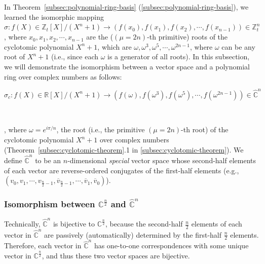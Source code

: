 In Theorem~\ref*{subsec:polynomial-ring-basis} (\autoref{subsec:polynomial-ring-basis}), we learned the isomorphic mapping $\sigma: f(X) \in \mathbb{Z}_t[X]/(X^n + 1) \longrightarrow (f(x_0),f(x_1),f(x_2), \cdots, f(x_{n-1})) \in \mathbb{Z}_t^n$, where $x_0, x_1, x_2, \cdots, x_{n-1}$ are the ($(\mu=2n)$-th primitive) roots of the cyclotomic polynomial $X^n + 1$, which are $\omega, \omega^3, \omega^5, \cdots, \omega^{2n-1}$, where $\omega$ can be any root of $X^n + 1$ (i.e., since each $\omega$ is a generator of all roots). In this subsection, we will demonstrate the isomorphism between a vector space and a polynomial ring over complex numbers as follows: 

$\sigma_c: f(X) \in \mathbb{R}[X]/(X^n + 1) \longrightarrow (f(\omega),f(\omega^3),f(\omega^5), \cdots, f(\omega^{2n-1})) \in \mathbb{\hat{C}}^{n}$

$ $

, where $\omega = e^{i\pi/n}$, the root (i.e., the primitive $(\mu=2n)$-th root) of the cyclotomic polynomial $X^n + 1$ over complex numbers (Theorem~\ref*{subsec:cyclotomic-theorem}.1 in \autoref{subsec:cyclotomic-theorem}). We define $\mathbb{\hat{C}}^{n}$ to be an $n$-dimensional \textit{special} vector space whose second-half elements of each vector are reverse-ordered conjugates of the first-half elements (e.g., $(v_0, v_1, \cdots, v_{\frac{n}{2}-1}, \overline{v}_{\frac{n}{2}-1}, \cdots, \overline{v}_1, \overline{v}_0 )$). 

\subsubsection{Isomorphism between $\mathbb{C}^{\frac{n}{2}}$ and $\mathbb{\hat C}^{n}$}
\label{subsec:poly-vector-transformation-complex-isomorphism1}


 Technically, $\mathbb{\hat{C}}^{n}$ is bijective to $\mathbb{C}^{\frac{n}{2}}$, because the second-half $\frac{n}{2}$ elements of each vector in $\mathbb{{\hat C}}^{n}$ are passively (automatically) determined by the first-half $\frac{n}{2}$ elements. Therefore, each vector in $\mathbb{\hat{C}}^{n}$ has one-to-one correspondences with some unique vector in $\mathbb{{C}}^{\frac{n}{2}}$, and thus these two vector spaces are bijective. 


